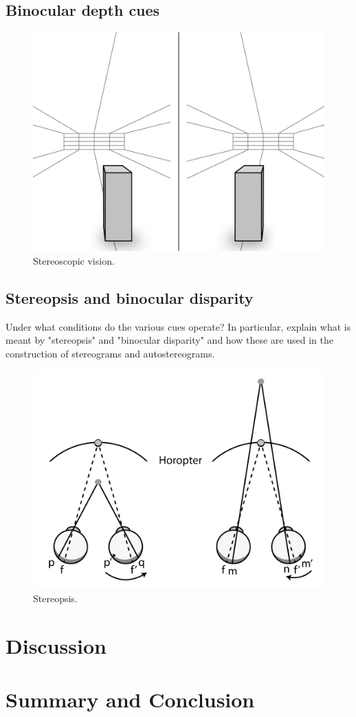 \subsection{Binocular depth cues}
\begin{figure}[H]
	\centering
	\includegraphics[width=1\linewidth]{figure/Analysis/stereoScopicVision.png}
	\caption{Stereoscopic vision.}
	\label{fig:stereoscopicVision}
\end{figure}


\subsection{Stereopsis and binocular disparity}
Under what conditions do the various cues operate? In particular, explain what is meant by "stereopsis" and "binocular disparity" and how these are used in the construction of stereograms and autostereograms.

\begin{figure}[H]
	\centering
	\includegraphics[width=1\linewidth]{figure/Analysis/stereopsis.png}
	\caption{Stereopsis.}
	\label{fig:stereopsis}
\end{figure}


\section{Discussion}

\section{Summary and Conclusion}


